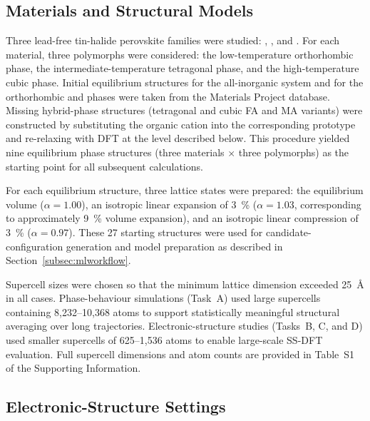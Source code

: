 \subsection{Materials and Structural Models}
\label{subsec:structures}

Three lead-free tin-halide perovskite families were studied:
\CsSnI{}, \FASnI{}, and \MASnI{}.
For each material, three polymorphs were considered: the
low-temperature orthorhombic phase, the intermediate-temperature
tetragonal phase, and the high-temperature cubic phase.
Initial equilibrium structures for the all-inorganic system and for
the orthorhombic \FASnI{} and \MASnI{} phases were taken from the
Materials Project database.\cite{mp2013}
Missing hybrid-phase structures (tetragonal and cubic FA and MA
variants) were constructed by substituting the organic cation into
the corresponding \CsSnI{} prototype and re-relaxing with DFT at
the level described below.
This procedure yielded nine equilibrium phase structures (three
materials $\times$ three polymorphs) as the starting point for all
subsequent calculations.

For each equilibrium structure, three lattice states were prepared:
the equilibrium volume ($\alpha = 1.00$), an isotropic linear
expansion of \SI{3}{\percent} ($\alpha = 1.03$, corresponding to
approximately \SI{9}{\percent} volume expansion), and an isotropic
linear compression of \SI{3}{\percent} ($\alpha = 0.97$).
These 27 starting structures were used for candidate-configuration
generation and model preparation as described in
Section~\ref{subsec:mlworkflow}.

Supercell sizes were chosen so that the minimum lattice dimension
exceeded \SI{25}{\angstrom} in all cases.
Phase-behaviour simulations (Task~A) used large supercells
containing 8{,}232--10{,}368 atoms to support statistically
meaningful structural averaging over long trajectories.
Electronic-structure studies (Tasks~B, C, and D) used smaller
supercells of 625--1{,}536 atoms to enable large-scale SS-DFT
evaluation.
Full supercell dimensions and atom counts are provided in
Table~S1 of the Supporting Information.

\subsection{Electronic-Structure Settings}
\label{subsec:dft_settings}

